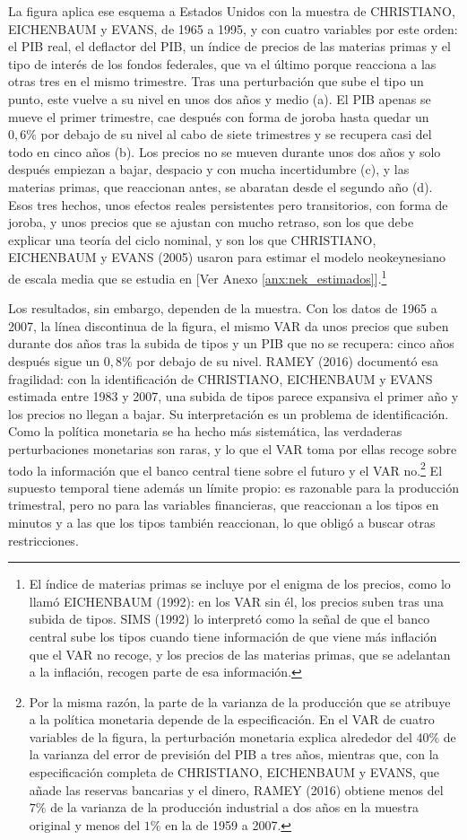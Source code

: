 \documentclass[10pt,a4paper]{article}
\newcommand{\authorfont}[1]{{\fontfamily{EBGaramond-TLF}\selectfont #1}}
\begin{document}
La figura aplica ese esquema a Estados Unidos con la muestra de CHRISTIANO, EICHENBAUM y EVANS, de 1965 a 1995, y con cuatro variables por este orden: el PIB real, el deflactor del PIB, un índice de precios de las materias primas y el tipo de interés de los fondos federales, que va el último porque reacciona a las otras tres en el mismo trimestre. Tras una perturbación que sube el tipo un punto, este vuelve a su nivel en unos dos años y medio (a). El PIB apenas se mueve el primer trimestre, cae después con forma de joroba hasta quedar un $0{,}6\%$ por debajo de su nivel al cabo de siete trimestres y se recupera casi del todo en cinco años (b). Los precios no se mueven durante unos dos años y solo después empiezan a bajar, despacio y con mucha incertidumbre (c), y las materias primas, que reaccionan antes, se abaratan desde el segundo año (d). Esos tres hechos, unos efectos reales persistentes pero transitorios, con forma de joroba, y unos precios que se ajustan con mucho retraso, son los que debe explicar una teoría del ciclo nominal, y son los que CHRISTIANO, EICHENBAUM y EVANS (2005) usaron para estimar el modelo neokeynesiano de escala media que se estudia en [\authorfont{Ver Anexo \ref{anx:nek_estimados}}].\footnote{%
    El índice de materias primas se incluye por el enigma de los precios, como lo llamó EICHENBAUM (1992): en los VAR sin él, los precios suben tras una subida de tipos. SIMS (1992) lo interpretó como la señal de que el banco central sube los tipos cuando tiene información de que viene más inflación que el VAR no recoge, y los precios de las materias primas, que se adelantan a la inflación, recogen parte de esa información.
}

Los resultados, sin embargo, dependen de la muestra. Con los datos de 1965 a 2007, la línea discontinua de la figura, el mismo VAR da unos precios que suben durante dos años tras la subida de tipos y un PIB que no se recupera: cinco años después sigue un $0{,}8\%$ por debajo de su nivel. RAMEY (2016) documentó esa fragilidad: con la identificación de CHRISTIANO, EICHENBAUM y EVANS estimada entre 1983 y 2007, una subida de tipos parece expansiva el primer año y los precios no llegan a bajar. Su interpretación es un problema de identificación. Como la política monetaria se ha hecho más sistemática, las verdaderas perturbaciones monetarias son raras, y lo que el VAR toma por ellas recoge sobre todo la información que el banco central tiene sobre el futuro y el VAR no.\footnote{%
    Por la misma razón, la parte de la varianza de la producción que se atribuye a la política monetaria depende de la especificación. En el VAR de cuatro variables de la figura, la perturbación monetaria explica alrededor del $40\%$ de la varianza del error de previsión del PIB a tres años, mientras que, con la especificación completa de CHRISTIANO, EICHENBAUM y EVANS, que añade las reservas bancarias y el dinero, RAMEY (2016) obtiene menos del $7\%$ de la varianza de la producción industrial a dos años en la muestra original y menos del $1\%$ en la de 1959 a 2007.
}
El supuesto temporal tiene además un límite propio: es razonable para la producción trimestral, pero no para las variables financieras, que reaccionan a los tipos en minutos y a las que los tipos también reaccionan, lo que obligó a buscar otras restricciones.
\end{document}
